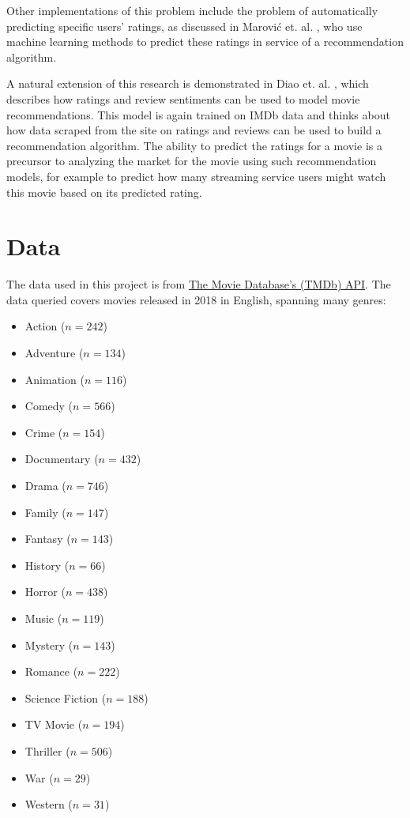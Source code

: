 \documentclass[12pt, oneside]{article}   	%
\begin{document}
Other implementations of this problem include the problem of automatically predicting specific users' ratings, as discussed in Marović et. al. \cite{marovic_automatic_2011}, who use machine learning methods to predict these ratings in service of a recommendation algorithm.

A natural extension of this research is demonstrated in Diao et. al. \cite{diao_jointly_2014}, which describes how ratings and review sentiments can be used to model movie recommendations. This model is again trained on IMDb data and thinks about how data scraped from the site on ratings and reviews can be used to build a recommendation algorithm. The ability to predict the ratings for a movie is a precursor to analyzing the market for the movie using such recommendation models, for example to predict how many streaming service users might watch this movie based on its predicted rating. 

\section{Data}

The data used in this project is from \href{https://api.tmdb.org}{The Movie Database's (TMDb) API}. The data queried covers movies released in 2018 in English, spanning many genres: 

\begin{itemize}
\item Action ($n=242$)
\item Adventure ($n=134$)
\item Animation ($n=116$)
\item Comedy ($n=566$)
\item Crime ($n=154$)
\item Documentary ($n=432$)
\item Drama ($n=746$)
\item Family ($n=147$)
\item Fantasy ($n=143$)
\item History ($n=66$)
\item Horror ($n=438$)
\item Music ($n=119$)
\item Mystery ($n=143$)
\item Romance ($n=222$)
\item Science Fiction ($n=188$)
\item TV Movie ($n=194$)
\item Thriller ($n=506$)
\item War ($n=29$)
\item Western ($n=31$)
\end{itemize}
\end{document}

